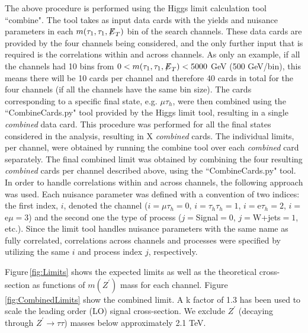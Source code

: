 The above procedure is performed using the Higgs limit calculation tool ``combine". The tool takes as input data cards with the yields and nuisance parameters in 
each $m(\tau_{1},\tau_{1},{\not\mathrel{E}}_T)$ bin of the search channels. These data cards are provided by the four channels being considered, and the only further input that 
is required is the correlations within and across channels. As only an example, if all the channels had 10 bins from $0 < m(\tau_{1},\tau_{1},{\not\mathrel{E}}_T) < 5000$ GeV 
(500 GeV/bin), this means there will be 10 cards per channel and therefore 40 cards in total for the four channels (if all the channels have the same bin size).
The cards corresponding to a specific final state, e.g. $\mu\tau_{h}$, were then combined using the ``CombineCards.py" tool provided by the Higgs limit tool, 
resulting in a single \textit{combined} data card. This procedure was performed for all the final states considered in the analysis, resulting in 
X \textit{combined} cards. The individual limits, per channel, were obtained by running the combine tool over each \textit{combined} card separately. The final 
combined limit was obtained by combining the four resulting \textit{combined} cards per channel described above, using the ``CombineCards.py" tool. In order to 
handle correlations within and across channels, the following approach was used. Each nuisance parameter was defined with a convention of two indices: the first 
index, $i$, denoted the channel ($i=\mu\tau_{h}=0$, $i=\tau_{h}\tau_{h}=1$, $i=$e$\tau_{h}=2$, $i=$e$\mu=3$) and the second one the type of process 
($j=$Signal$=0$, $j=$W+jets$=1$, etc.). Since the limit tool handles nuisance parameters with the same name as fully correlated, correlations across channels and 
processes were specified by utilizing the same $i$ and process index $j$, respectively.

Figure\,\ref{fig:Limits} shows the expected limits as well as the theoretical cross-section as functions of $m(Z^{\prime})$ mass for each channel. 
Figure\,\ref{fig:CombinedLimits} show the combined limit. A k factor of 1.3 has been used to scale the leading order (LO) signal cross-section. 
We exclude $Z^{\prime}$ (decaying through $Z^{\prime}\to\tau\tau$) masses below approximately 2.1 TeV. 

